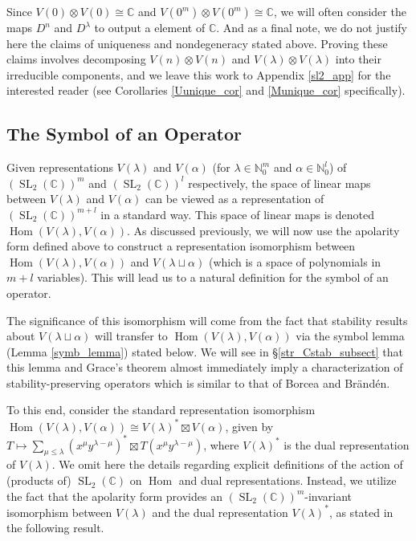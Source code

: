 \documentclass{article}
\theoremstyle{definition}
\theoremstyle{plain}
\newcommand{\C}{\mathbb{C}}
\newcommand{\N}{\mathbb{N}}
\DeclareMathOperator{\Hom}{Hom}
\DeclareMathOperator{\SL}{SL}
\begin{document}
Since $V(0) \otimes V(0) \cong \C$ and $V(0^m) \otimes V(0^m) \cong \C$, we will often consider the maps $D^n$ and $D^\lambda$ to output a element of $\C$. And as a final note, we do not justify here the claims of uniqueness and nondegeneracy stated above. Proving these claims involves decomposing $V(n) \otimes V(n)$ and $V(\lambda) \otimes V(\lambda)$ into their irreducible components, and we leave this work to Appendix \ref{sl2_app} for the interested reader (see Corollaries \ref{Uunique_cor} and \ref{Munique_cor} specifically).

\subsection{The Symbol of an Operator}\label{symb_subsect}

Given representations $V(\lambda)$ and $V(\alpha)$ (for $\lambda \in \N_0^m$ and $\alpha \in \N_0^l$) of $(\SL_2(\C))^m$ and $(\SL_2(\C))^l$ respectively, the space of linear maps between $V(\lambda)$ and $V(\alpha)$ can be viewed as a representation of $(\SL_2(\C))^{m+l}$ in a standard way. This space of linear maps is denoted $\Hom(V(\lambda),V(\alpha))$. As discussed previously, we will now use the apolarity form defined above to construct a representation isomorphism between $\Hom(V(\lambda),V(\alpha))$ and $V(\lambda \sqcup \alpha)$ (which is a space of polynomials in $m+l$ variables). This will lead us to a natural definition for the symbol of an operator.

The significance of this isomorphism will come from the fact that stability results about $V(\lambda \sqcup \alpha)$ will transfer to $\Hom(V(\lambda),V(\alpha))$ via the symbol lemma (Lemma \ref{symb_lemma}) stated below. We will see in \S\ref{str_Cstab_subsect} that this lemma and Grace's theorem almost immediately imply a characterization of stability-preserving operators which is similar to that of Borcea and Br{\"a}nd{\'e}n.

To this end, consider the standard representation isomorphism $\Hom(V(\lambda),V(\alpha)) \cong V(\lambda)^* \boxtimes V(\alpha)$, given by $T \mapsto \sum_{\mu \leq \lambda} (x^\mu y^{\lambda-\mu})^* \boxtimes T(x^\mu y^{\lambda-\mu})$, where $V(\lambda)^*$ is the dual representation of $V(\lambda)$. We omit here the details regarding explicit definitions of the action of (products of) $\SL_2(\C)$ on $\Hom$ and dual representations. Instead, we utilize the fact that the apolarity form provides an $(\SL_2(\C))^m$-invariant isomorphism between $V(\lambda)$ and the dual representation $V(\lambda)^*$, as stated in the following result.
\end{document}
